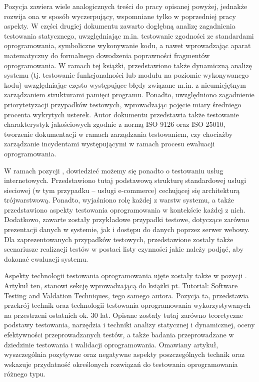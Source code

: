 Pozycja \cite{roman2015testowanie} zawiera wiele analogicznych treści do pracy opisanej powyżej, jednakże rozwija ona w sposób wyczerpujący, wspomniane tylko w poprzedniej pracy aspekty. W części drugiej dokumentu zawarto dogłębną analizę zagadnienia testowania statycznego, uwzględniając m.in. testowanie zgodności ze standardami oprogramowania, symboliczne wykonywanie kodu, a nawet wprowadzając aparat matematyczny do formalnego dowodzenia poprawności fragmentów oprogramowania. W ramach tej książki, przedstawiono także dynamiczną analizę systemu (tj. testowanie funkcjonalności lub modułu na poziomie wykonywanego kodu) uwzględniając często występujące błędy związane m.in. z nieumiejętnym zarządzaniem strukturami pamięci programu. Ponadto, uwzględniono zagadnienie priorytetyzacji przypadków testowych, wprowadzając pojęcie miary średniego procenta wykrytych usterek. Autor dokumentu przedstawia także testowanie charakterystyk jakościowych zgodnie z normą ISO 9126 oraz ISO 25010, tworzenie dokumentacji w ramach zarządzania testowaniem, czy chociażby zarządzanie incydentami występującymi w ramach procesu ewaluacji oprogramowania.

W ramach pozycji \cite{myers2011art}, dowiedzieć możemy się ponadto o testowaniu usług internetowych. Przedstawiono tutaj podstawową strukturę standardowej usługi sieciowej (w tym przypadku – usługi e-commerce) cechującej się architekturą trójwarstwową. Ponadto, wyjaśniono rolę każdej z warstw systemu, a także przedstawiono aspekty testowania oprogramowania w kontekście każdej z nich. Dodatkowo, zawarte zostały przykładowe przypadki testowe, dotyczące zarówno prezentacji danych w systemie, jak i dostępu do danych poprzez serwer webowy. Dla zaprezentowanych przypadków testowych, przedstawione zostały także scenariusze realizacji testów w postaci listy czynności jakie należy podjąć, aby dokonać ewaluacji systemu.

Aspekty technologii testowania oprogramowania ujęte zostały także w pozycji \cite{miller1981introduction}. Artykuł ten, stanowi sekcję wprowadzającą do książki pt. Tutorial: Software Testing and Valdation Techniques, tego samego autora. Pozycja ta, przedstawia przekrój technik oraz technologii testowania oprogramowania wykorzystywanych na przestrzeni ostatnich ok. 30 lat. Opisane zostały tutaj zarówno teoretyczne podstawy testowania, narzędzia i techniki analizy statycznej i dynamicznej, oceny efektywności przeprowadzanych testów, a także badania przeprowadzane w dziedzinie testowania i walidacji oprogramowania. Omawiany artykuł, wyszczególnia pozytywne oraz negatywne aspekty poszczególnych technik oraz wskazuje przydatność określonych rozwiązań do testowania oprogramowania różnego typu.

